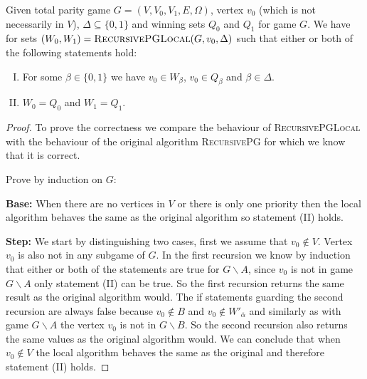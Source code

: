 \begin{theorem}
	Given total parity game $G = (V,V_0,V_1,E,\Omega)$, vertex $v_0$ (which is not necessarily in $V$), $\Delta \subseteq \{0,1\}$ and winning sets $Q_0$ and $Q_1$ for game $G$. We have for sets $(W_0,W_1) = \textsc{RecursivePGLocal}(G,v_0,\Delta)$ such that either or both of the following statements hold:
	\begin{enumerate}[(I)]
		\item For some $\beta \in \{0,1\}$ we have $v_0 \in W_\beta$, $v_0 \in Q_\beta$ and $\beta \in \Delta$.
		\item $W_0 = Q_0$ and $W_1 = Q_1$.
	\end{enumerate}
\begin{proof}
	To prove the correctness we compare the behaviour of \textsc{RecursivePGLocal} with the behaviour of the original algorithm \textsc{RecursivePG} for which we know that it is correct.
	
	Prove by induction on $G$:
	
	\textbf{Base: } When there are no vertices in $V$ or there is only one priority then the local algorithm behaves the same as the original algorithm so statement (II) holds.
	
	
	\textbf{Step: } We start by distinguishing two cases, first we assume that $v_0 \notin V$. Vertex $v_0$ is also not in any subgame of $G$. In the first recursion we know by induction that either or both of the statements are true for $G\backslash A$, since $v_0$ is not in game $G\backslash A$ only statement (II) can be true. So the first recursion returns the same result as the original algorithm would. The if statements guarding the second recursion are always false because $v_0 \notin B$ and $v_0 \notin W'_{\overline{\alpha}}$ and similarly as with game $G\backslash A$ the vertex $v_0$ is not in $G\backslash B$. So the second recursion also returns the same values as the original algorithm would. We can conclude that when $v_0 \notin V$ the local algorithm behaves the same as the original and therefore statement (II) holds.
	

\end{proof}
\end{theorem}

